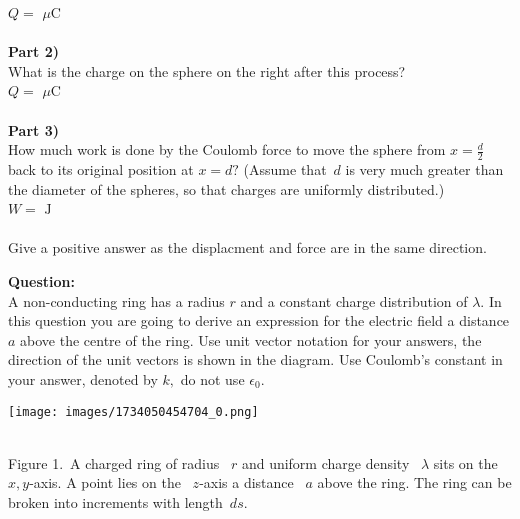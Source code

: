 \documentclass[addpoints,12pt, margin-left=35px]{exam}
\begin{document}
$ Q = $  \underline{\hspace{3cm}}  $\mu \text{C}$ \\

\\

\textbf{Part 2)}\\

What is the charge on the sphere on the right after this process?\\

$ Q = $  \underline{\hspace{3cm}}  $\mu \text{C}$ \\

\\

\textbf{Part 3)}\\

How much work is done by the Coulomb force to move the sphere from $x = \frac{d}{2}$ back to its original position at $x = d?$ (Assume that $d$ is very much greater than the diameter of the spheres, so that charges are uniformly distributed.)\\

$ W = $  \underline{\hspace{3cm}}  $\text{J}$ \\

\\

Give a positive answer as the displacment and force are in the same direction.\\

\newpage

\textbf{Question:}\\

A non-conducting ring has a radius $r $ and a constant charge distribution of $\lambda $. In this question you are going to derive an expression for the electric field a distance $a $ above the centre of the ring. Use unit vector notation for your answers, the direction of the unit vectors is shown in the diagram. Use Coulomb's constant in your answer, denoted by $k,$ do not use $\epsilon_0.$\\

\begin{center}
\texttt{[image: images/1734050454704\_0.png]}
\end{center}\\

Figure 1. A charged ring of radius  $ r $ and uniform charge density  $ \lambda$ sits on the  $ x, y $-axis. A point lies on the  $ z $-axis a distance  $ a $ above the ring. The ring can be broken into increments with length $ ds $. \\
\end{document}
